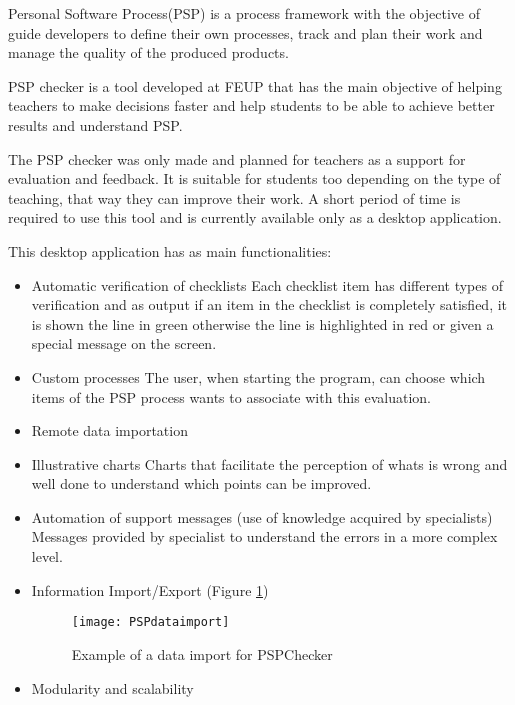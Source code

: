 Personal Software Process(PSP) \citep{humphrey2005psp} is a process framework with the objective of guide developers to define their own processes, track and plan their work and manage the quality of the produced products.

PSP checker\citep{Pinto2010} is a tool developed at FEUP that has the main objective of helping teachers to make decisions faster and help students to be able to achieve better results and understand PSP.

The PSP checker was only made and planned for teachers as a support for evaluation and feedback. It is suitable for students too depending on the type of teaching, that way they can improve their work. A short period of time is required to use this tool and is currently available only as a desktop application.


This desktop application has as main functionalities:
\begin{itemize}
	\item Automatic verification of checklists
	\subitem Each checklist item has different types of verification and as output if an item in the checklist is completely satisfied, it is shown the line in green otherwise the line is highlighted in red or given a special message on the screen.
	\item Custom processes
	\subitem The user, when starting the program, can choose which items of the PSP process wants to associate with this evaluation.
	\item Remote data importation
	\item Illustrative charts
	\subitem Charts that facilitate the perception of whats is wrong and well done to understand which points can be improved.
	\item Automation of support messages (use of knowledge acquired by specialists)
	\subitem Messages provided by specialist to understand the errors in a more complex level.
	\item Information Import/Export (Figure \ref{fig:PSPdataimport})
	\begin{figure}[h]
		\begin{center}
			\leavevmode
			\texttt{[image: PSPdataimport]}
			\caption{Example of a data import for PSPChecker}
			\label{fig:PSPdataimport}
		\end{center}
	\end{figure}
	\item Modularity and scalability
\end{itemize}

